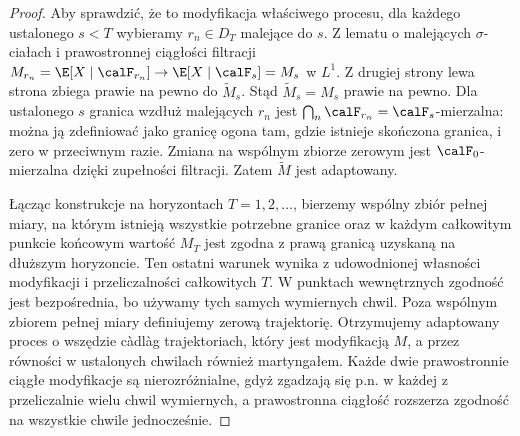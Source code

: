 \begin{proof}
Aby sprawdzić, że to modyfikacja właściwego procesu, dla
każdego ustalonego $s<T$ wybieramy $r_n\in D_T$ malejące
do $s$. Z lematu o malejących $\sigma$-ciałach i prawostronnej
ciągłości filtracji
$M_{r_n}=\E[X\mid\calF_{r_n}]\to
\E[X\mid\calF_s]=M_s$ w $L^1$.
Z drugiej strony lewa strona zbiega prawie na pewno do
$\widetilde M_s$. Stąd $\widetilde M_s=M_s$ prawie na pewno.
Dla ustalonego $s$ granica wzdłuż malejących
$r_n$ jest $\bigcap_n\calF_{r_n}=\calF_s$-mierzalna:
można ją zdefiniować jako granicę ogona tam,
gdzie istnieje skończona granica, i zero w przeciwnym
razie. Zmiana na wspólnym zbiorze zerowym jest
$\calF_0$-mierzalna dzięki zupełności filtracji.
Zatem $\widetilde M$ jest adaptowany.

Łącząc konstrukcje na horyzontach $T=1,2,\ldots$,
bierzemy wspólny zbiór pełnej miary, na którym
istnieją wszystkie potrzebne granice oraz
w każdym całkowitym punkcie końcowym wartość
$M_T$ jest zgodna z prawą granicą uzyskaną
na dłuższym horyzoncie. Ten ostatni warunek
wynika z udowodnionej własności modyfikacji
i przeliczalności całkowitych $T$.
W punktach wewnętrznych zgodność jest bezpośrednia,
bo używamy tych samych wymiernych chwil.
Poza wspólnym zbiorem pełnej miary definiujemy
zerową trajektorię. Otrzymujemy adaptowany proces
o wszędzie c\`adl\`ag trajektoriach, który jest
modyfikacją $M$, a przez równości w ustalonych
chwilach również martyngałem.
Każde dwie prawostronnie ciągłe modyfikacje
są nierozróżnialne, gdyż zgadzają się p.n.
w każdej z przeliczalnie wielu chwil wymiernych,
a prawostronna ciągłość rozszerza zgodność
na wszystkie chwile jednocześnie.
\end{proof}

